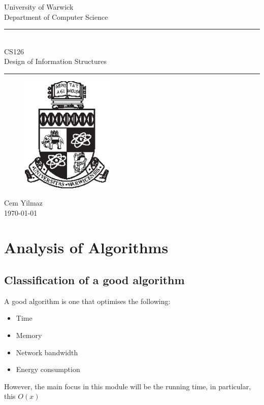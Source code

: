 \documentclass[a4paper]{article}
\theoremstyle{plain}
\theoremstyle{definition}
\theoremstyle{remark}
\begin{document}
	\begin{titlepage}
	\begin{center}
	\large
	University of Warwick \\
	Department of Computer Science \\
	\huge
	\vspace{50mm}
	\rule{\linewidth}{0.5pt} \\
	CS126 \\
	\vspace{5mm}
	\Large
	Design of Information Structures
	\rule{\linewidth}{0.5pt}
	\vspace{5mm}
	\begin{figure}[H]
	\centering
	\includegraphics[width=0.4\textwidth]{crest.eps}
	\end{figure}
	\vspace{37mm}
	Cem Yilmaz \\
	\today
	\end{center}
	\end{titlepage}	
	\newpage
	\tableofcontents
	\newpage
\section{Analysis of Algorithms}
\subsection{Classification of a good algorithm}
A good algorithm is one that optimises the following:
\begin{itemize}
	\item Time
	\item Memory
	\item Network bandwidth
	\item Energy consumption
\end{itemize}
However, the main focus in this module will be the running time, in particular, this $O(x)$
\end{document}

